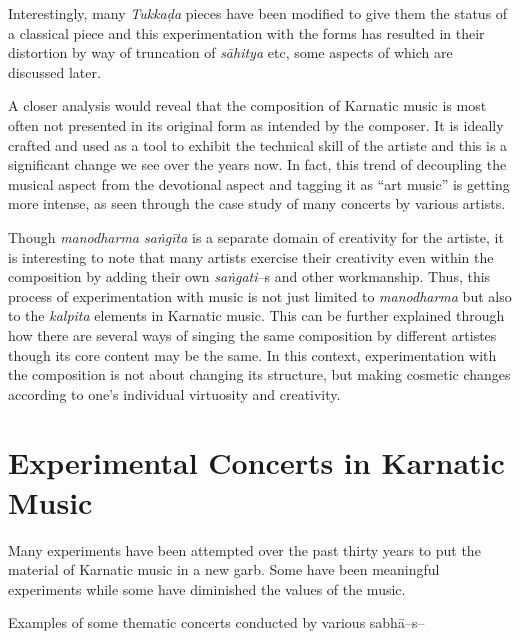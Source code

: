 Interestingly, many \textit{Tukkaḍa} pieces have been modified to give them the status of a classical piece and this experimentation with the forms has resulted in their distortion by way of truncation of \textit{sāhitya} etc, some aspects of which are discussed later.

A closer analysis would reveal that the composition of Karnatic music is most often not presented in its original form as intended by the composer. It is ideally crafted and used as a tool to exhibit the technical skill of the artiste and this is a significant change we see over the years now. In fact, this trend of decoupling the musical aspect from the devotional aspect and tagging it as “art music” is getting more intense, as seen through the case study of many concerts by various artists.

Though \textit{manodharma saṅgīta} is a separate domain of creativity for the artiste, it is interesting to note that many artists exercise their creativity even within the composition by adding their own \textit{saṅgati}–s and other workmanship. Thus, this process of experimentation with music is not just limited to \textit{manodharma} but also to the \textit{kalpita} elements in Karnatic music. This can be further explained through how there are several ways of singing the same composition by different artistes though its core content may be the same. In this context, experimentation with the composition is not about changing its structure, but making cosmetic changes according to one’s individual virtuosity and creativity.


\section*{Experimental Concerts in Karnatic Music}

Many experiments have been attempted over the past thirty years to put the material of Karnatic music in a new garb. Some have been meaningful experiments while some have diminished the values of the music.

Examples of some thematic concerts conducted by various sabhā–s–

